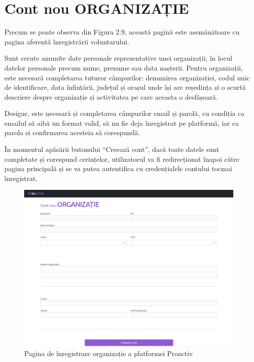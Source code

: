 \documentclass[12pt,a4paper]{report}
\begin{document}
\section{Cont nou ORGANIZAȚIE}
\par
Precum se poate observa din Figura 2.9, această pagină este asemănătoare cu pagina aferentă înregistrării voluntarului.
\\\par
Sunt cerute anumite date personale reprezentative unei organizații, în locul datelor personale precum nume, prenume sau data nașterii. Pentru organizații, este necesară completarea tuturor câmpurilor: denumirea organizației, codul unic de identificare, data înfințării, județul și orașul unde își are reședința și o scurtă descriere despre organizație și activitatea pe care aceasta o desfășoară.
\\\par
Desigur, este necesară și completarea câmpurilor email și parolă, cu condiția ca emailul să aibă un format valid, să nu fie deja înregistrat pe platformă, iar ca parola și confirmarea acesteia să corespundă.
\\\par
În momentul apăsării butonului “Creează cont”, dacă toate datele sunt completate și corespund cerințelor, utilizatorul va fi redirecționat înapoi către pagina principală și se va putea autentifica cu credențialele contului tocmai înregistrat.
\\
\begin{figure}[H]
\centering
  \includegraphics[width=1\linewidth]{./imagini/contorg.jpg}
  \caption{Pagina de înregistrare organizație a platformei Proactiv}
\end{figure}
\end{document}
